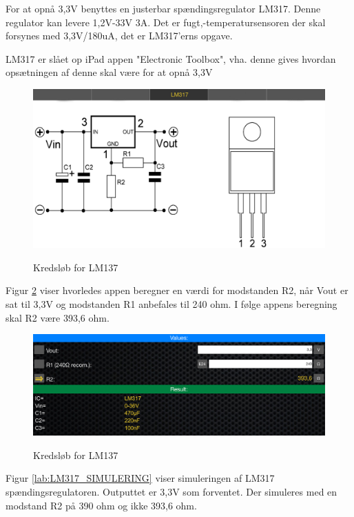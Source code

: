For at opnå 3,3V benyttes en justerbar spændingsregulator LM317. Denne regulator kan levere 1,2V-33V 3A. Det er fugt,-temperatursensoren der skal forsynes med 3,3V/180uA, det er LM317'erns opgave. 

LM317 er slået op iPad appen "Electronic Toolbox", vha. denne gives hvordan opsætningen af denne skal være for at opnå 3,3V 
 
\begin{figure}[H] \centering
{\includegraphics[width=\textwidth]{filer/design/Billeder/LM317}}
\caption{Kredsløb for LM137}
\label{lab:LM317}
\raggedright
\end{figure}

Figur \ref{lab:LM317_calc} viser hvorledes appen beregner en værdi for modstanden R2, når Vout er sat til 3,3V og modstanden R1 anbefales til 240 ohm. I følge appens beregning skal R2 være 393,6 ohm.

\begin{figure}[H] \centering
{\includegraphics[width=\textwidth]{filer/design/Billeder/LM317_calc}}
\caption{Kredsløb for LM137}
\label{lab:LM317_calc}
\raggedright
\end{figure}

Figur \ref{lab:LM317_SIMULERING} viser simuleringen af LM317 spændingsregulatoren. Outputtet er 3,3V som forventet. Der simuleres med en modstand R2 på 390 ohm og ikke 393,6 ohm.

